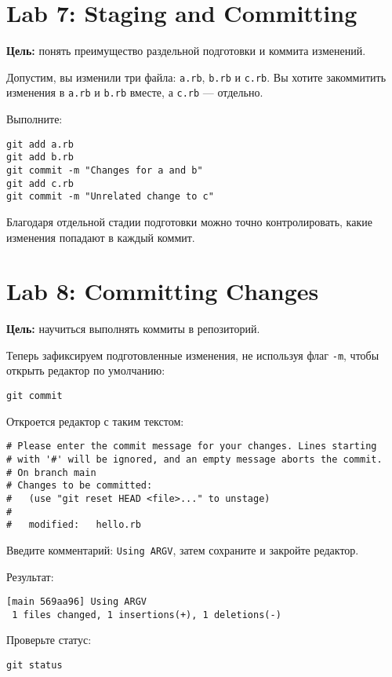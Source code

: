 \documentclass[a4paper,12pt]{report}
\begin{document}
\section{Lab 7: Staging and Committing}
\textbf{Цель:} понять преимущество раздельной подготовки и коммита изменений.

Допустим, вы изменили три файла: \texttt{a.rb}, \texttt{b.rb} и \texttt{c.rb}. Вы хотите закоммитить изменения в \texttt{a.rb} и \texttt{b.rb} вместе, а \texttt{c.rb} — отдельно.

Выполните:
\begin{verbatim}
git add a.rb
git add b.rb
git commit -m "Changes for a and b"
git add c.rb
git commit -m "Unrelated change to c"
\end{verbatim}

Благодаря отдельной стадии подготовки можно точно контролировать, какие изменения попадают в каждый коммит.


\section{Lab 8: Committing Changes}
\textbf{Цель:} научиться выполнять коммиты в репозиторий.

Теперь зафиксируем подготовленные изменения, не используя флаг \texttt{-m}, чтобы открыть редактор по умолчанию:
\begin{verbatim}
git commit
\end{verbatim}

Откроется редактор с таким текстом:
\begin{verbatim}
# Please enter the commit message for your changes. Lines starting
# with '#' will be ignored, and an empty message aborts the commit.
# On branch main
# Changes to be committed:
#   (use "git reset HEAD <file>..." to unstage)
#
#	modified:   hello.rb
\end{verbatim}

Введите комментарий: \texttt{Using ARGV}, затем сохраните и закройте редактор.

Результат:
\begin{verbatim}
[main 569aa96] Using ARGV
 1 files changed, 1 insertions(+), 1 deletions(-)
\end{verbatim}

Проверьте статус:
\begin{verbatim}
git status
\end{verbatim}
\end{document}
